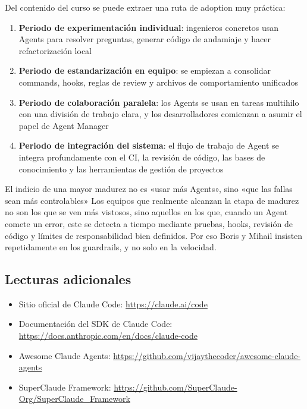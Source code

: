 \documentclass[a4paper]{article}
\begin{document}
Del contenido del curso se puede extraer una ruta de adoption muy práctica:

\begin{enumerate}
    \item \textbf{Periodo de experimentación individual}: ingenieros concretos usan Agents para resolver preguntas, generar código de andamiaje y hacer refactorización local
    \item \textbf{Periodo de estandarización en equipo}: se empiezan a consolidar commands, hooks, reglas de review y archivos de comportamiento unificados
    \item \textbf{Periodo de colaboración paralela}: los Agents se usan en tareas multihilo con una división de trabajo clara, y los desarrolladores comienzan a asumir el papel de Agent Manager
    \item \textbf{Periodo de integración del sistema}: el flujo de trabajo de Agent se integra profundamente con el CI, la revisión de código, las bases de conocimiento y las herramientas de gestión de proyectos
\end{enumerate}

\begin{knowledgebox}{El indicio de una mayor madurez no es «usar más Agents», sino «que las fallas sean más controlables»}
Los equipos que realmente alcanzan la etapa de madurez no son los que se ven más vistosos, sino aquellos en los que, cuando un Agent comete un error, este se detecta a tiempo mediante pruebas, hooks, revisión de código y límites de responsabilidad bien definidos. Por eso Boris y Mihail insisten repetidamente en los guardrails, y no solo en la velocidad.
\end{knowledgebox}

\subsection{Lecturas adicionales}

\begin{itemize}
    \item Sitio oficial de Claude Code: \url{https://claude.ai/code}
    \item Documentación del SDK de Claude Code: \url{https://docs.anthropic.com/en/docs/claude-code}
    \item Awesome Claude Agents: \url{https://github.com/vijaythecoder/awesome-claude-agents}
    \item SuperClaude Framework: \url{https://github.com/SuperClaude-Org/SuperClaude_Framework}
\end{itemize}

\end{document}
